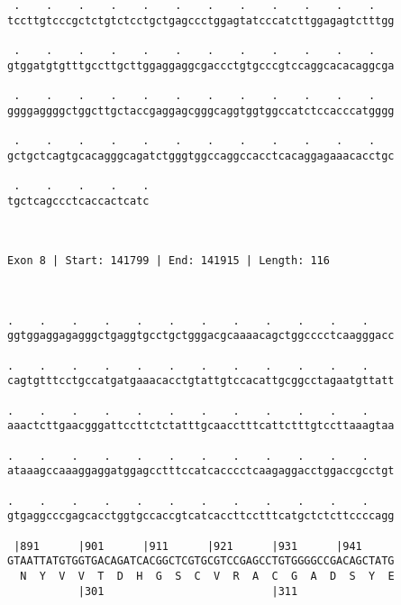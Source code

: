 \documentclass{article}
\begin{document}
\begin{Verbatim}
 .    .    .    .    .    .    .    .    .    .    .    .   
tccttgtcccgctctgtctcctgctgagccctggagtatcccatcttggagagtctttgg
                                                            
 .    .    .    .    .    .    .    .    .    .    .    .   
gtggatgtgtttgccttgcttggaggaggcgaccctgtgcccgtccaggcacacaggcga
                                                            
 .    .    .    .    .    .    .    .    .    .    .    .   
ggggaggggctggcttgctaccgaggagcgggcaggtggtggccatctccacccatgggg
                                                            
 .    .    .    .    .    .    .    .    .    .    .    .   
gctgctcagtgcacagggcagatctgggtggccaggccacctcacaggagaaacacctgc
                                                            
 .    .    .    .    .
tgctcagccctcaccactcatc
                      
                      
 
Exon 8 | Start: 141799 | End: 141915 | Length: 116



.    .    .    .    .    .    .    .    .    .    .    .    
ggtggaggagagggctgaggtgcctgctgggacgcaaaacagctggcccctcaagggacc
                                                            
.    .    .    .    .    .    .    .    .    .    .    .    
cagtgtttcctgccatgatgaaacacctgtattgtccacattgcggcctagaatgttatt
                                                            
.    .    .    .    .    .    .    .    .    .    .    .    
aaactcttgaacgggattccttctctatttgcaacctttcattctttgtccttaaagtaa
                                                            
.    .    .    .    .    .    .    .    .    .    .    .    
ataaagccaaaggaggatggagcctttccatcacccctcaagaggacctggaccgcctgt
                                                            
.    .    .    .    .    .    .    .    .    .    .    .    
gtgaggcccgagcacctggtgccaccgtcatcaccttcctttcatgctctcttccccagg
                                                            
 |891      |901      |911      |921      |931      |941     
GTAATTATGTGGTGACAGATCACGGCTCGTGCGTCCGAGCCTGTGGGGCCGACAGCTATG
  N  Y  V  V  T  D  H  G  S  C  V  R  A  C  G  A  D  S  Y  E
           |301                          |311               
  

\end{Verbatim}
\end{document}
